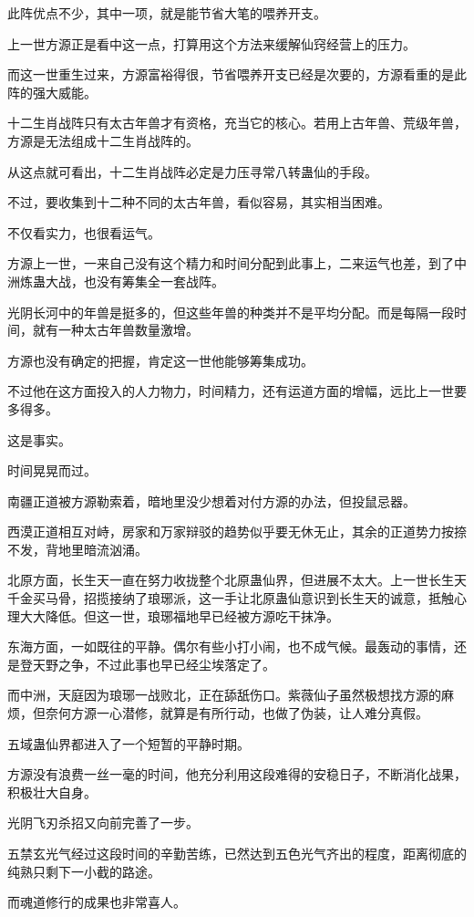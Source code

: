 \begin{this_body}
此阵优点不少，其中一项，就是能节省大笔的喂养开支。

上一世方源正是看中这一点，打算用这个方法来缓解仙窍经营上的压力。

而这一世重生过来，方源富裕得很，节省喂养开支已经是次要的，方源看重的是此阵的强大威能。

十二生肖战阵只有太古年兽才有资格，充当它的核心。若用上古年兽、荒级年兽，方源是无法组成十二生肖战阵的。

从这点就可看出，十二生肖战阵必定是力压寻常八转蛊仙的手段。

不过，要收集到十二种不同的太古年兽，看似容易，其实相当困难。

不仅看实力，也很看运气。

方源上一世，一来自己没有这个精力和时间分配到此事上，二来运气也差，到了中洲炼蛊大战，也没有筹集全一套战阵。

光阴长河中的年兽是挺多的，但这些年兽的种类并不是平均分配。而是每隔一段时间，就有一种太古年兽数量激增。

方源也没有确定的把握，肯定这一世他能够筹集成功。

不过他在这方面投入的人力物力，时间精力，还有运道方面的增幅，远比上一世要多得多。

这是事实。

时间晃晃而过。

南疆正道被方源勒索着，暗地里没少想着对付方源的办法，但投鼠忌器。

西漠正道相互对峙，房家和万家辩驳的趋势似乎要无休无止，其余的正道势力按捺不发，背地里暗流汹涌。

北原方面，长生天一直在努力收拢整个北原蛊仙界，但进展不太大。上一世长生天千金买马骨，招揽接纳了琅琊派，这一手让北原蛊仙意识到长生天的诚意，抵触心理大大降低。但这一世，琅琊福地早已经被方源吃干抹净。

东海方面，一如既往的平静。偶尔有些小打小闹，也不成气候。最轰动的事情，还是登天野之争，不过此事也早已经尘埃落定了。

而中洲，天庭因为琅琊一战败北，正在舔舐伤口。紫薇仙子虽然极想找方源的麻烦，但奈何方源一心潜修，就算是有所行动，也做了伪装，让人难分真假。

五域蛊仙界都进入了一个短暂的平静时期。

方源没有浪费一丝一毫的时间，他充分利用这段难得的安稳日子，不断消化战果，积极壮大自身。

光阴飞刃杀招又向前完善了一步。

五禁玄光气经过这段时间的辛勤苦练，已然达到五色光气齐出的程度，距离彻底的纯熟只剩下一小截的路途。

而魂道修行的成果也非常喜人。


\end{this_body}
